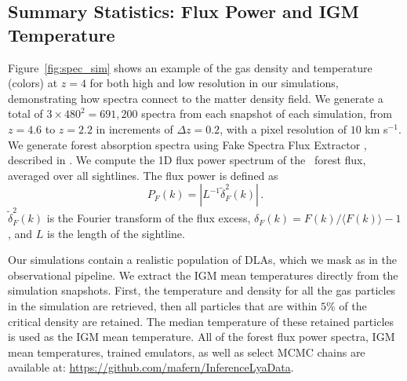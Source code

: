 

\subsection{Summary Statistics: Flux Power and IGM Temperature}\label{sec:sim_fps}

Figure~\ref{fig:spec_sim} shows an example of the gas density and temperature (colors) at $z=4$ for both high and low resolution in our simulations, demonstrating how spectra connect to the matter density field.
We generate a total of $3\times 480^2 = 691,200$ spectra from each snapshot of each simulation, from $z=4.6$ to $z=2.2$ in increments of $\Delta z=0.2$, with a pixel resolution of $10$ km s$^{-1}$.
We generate \lya forest absorption spectra using Fake Spectra Flux Extractor \cite{2017ascl.soft10012B}\footnotemark, described in \cite{2015MNRAS.447.1834B}.
We compute the 1D flux power spectrum of the \Lya~forest flux, averaged over all sightlines. The flux power is defined as 
\begin{equation}
 P_F(k) = |L^{-1}\tilde{\delta}^2_F(k)|\,.   
\end{equation}
$\tilde{\delta}^2_F(k)$ is the Fourier transform of the flux excess, $\delta_F(k) = F(k)/\langle F(k) \rangle - 1$, and $L$ is the length of the sightline. 

Our simulations contain a realistic population of DLAs, which we mask as in the observational pipeline. We extract the IGM mean temperatures directly from the simulation snapshots. First, the temperature and density for all the gas particles in the simulation are retrieved, then all particles that are within $5\%$ of the critical density are retained. The median temperature of these retained particles is used as the IGM mean temperature. All of the \lya forest flux power spectra, IGM mean temperatures, trained emulators, as well as select MCMC chains are available at: \url{https://github.com/mafern/InferenceLyaData}.

